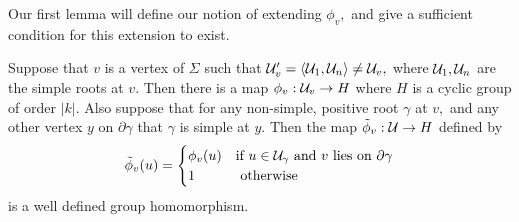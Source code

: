\documentclass[class=book, crop=false,12 pt]{standalone}
\begin{document}
Our first lemma will define our notion of extending $\phi_v,$ and give a sufficient condition for this extension to exist.
\begin{lemma}
	Suppose that $v$ is a vertex of $\Sigma$ such that $\mathcal{U}'_v=\langle \mathcal{U}_1,\mathcal{U}_n\rangle\neq \mathcal{U}_v,$ where $\mathcal{U}_1,\mathcal{U}_n$ are the simple roots at $v.$ Then there is a map $\phi_v:\mathcal{U}_v\to H$ where $H$ is a cyclic group of order $|k|.$ Also suppose that for any non-simple, positive root $\gamma$ at $v,$ and any other vertex $y$ on $\partial\gamma$ that $\gamma$ is simple at $y.$ Then the map $\tilde{\phi}_v:\mathcal{U}\to H$ defined by
\[
	\tilde{\phi}_v(u)=\begin{cases} \phi_v(u)&\text{if }u\in \mathcal{U}_\gamma\text{ and }v\text{ lies on }\partial\gamma\\
		1&\text{ otherwise}
	\end{cases}
\]
is a well defined group homomorphism.
	\label{existence}
\end{lemma}
\end{document}
